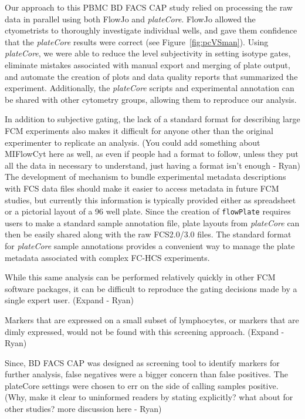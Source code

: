 \documentclass[12pt]{article}
\newcommand{\Robject}[1]{{\texttt{#1}}}
\newcommand{\Rpackage}[1]{{\textit{#1}}}
\begin{document}
Our approach to this PBMC BD FACS CAP study relied on processing the raw data
in parallel using both FlowJo and \Rpackage{plateCore}. FlowJo allowed the
ctyometrists to thoroughly investigate individual wells, and gave them
confidence that the \Rpackage{plateCore} results were correct (see
Figure~\ref{fig:pcVSman}). Using \Rpackage{plateCore}, we were able to reduce
the level subjectivity in setting isotype gates, eliminate mistakes associated
with manual export and merging of plate output, and automate the creation of
plots and data quality reports that summarized the experiment. Additionally,
the \Rpackage{plateCore} scripts and experimental annotation can be shared with
other cytometry groups, allowing them to reproduce our analysis.

In addition to subjective gating, the lack of a standard format for describing
large FCM experiments also makes it difficult for anyone other than the
original experimenter to replicate an analysis. (You could add something about
MIFlowCyt here as well, as even if people had a format to follow, unless they
put all the data in necessary to understand, just having a format isn't enough
- Ryan) The development of mechanism to bundle experimental metadata
descriptions with FCS data files should make it easier to access metadata in
future FCM studies, but currently this information is typically provided either
as spreadsheet or a pictorial layout of a 96 well plate. Since the creation of
\Robject{flowPlate} requires users to make a standard sample annotation file,
plate layouts from \Rpackage{plateCore} can then be easily shared along with
the raw FCS2.0/3.0 files. The standard format for \Rpackage{plateCore} sample
annotations provides a convenient way to manage the plate metadata associated
with complex FC-HCS experiments.

While this same analysis can be performed relatively quickly in 
other FCM software packages, it can be difficult to reproduce the gating
decisions made by a single expert user. (Expand - Ryan)

Markers that are expressed on a small subset of lymphocytes, or markers that
are dimly expressed, would not be found with this screening approach.
(Expand - Ryan)

Since, BD FACS CAP was designed as screening tool to 
identify markers for further analysis, false negatives were a bigger concern
than false positives. The plateCore settings were chosen to err on the side of
calling samples positive. (Why, make it clear to uninformed readers by stating
explicitly? what about for other studies? more discussion here - Ryan)
\end{document}
